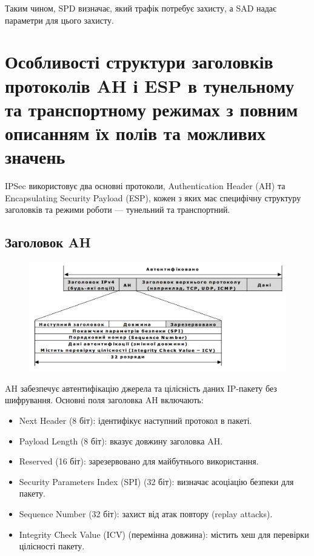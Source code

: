 Таким чином, SPD визначає, який трафік потребує захисту, а SAD надає параметри для цього захисту.

\section{Особливості структури заголовків протоколів AH і ESP в тунельному та транспортному режимах з повним описанням їх полів та можливих значень}

IPSec використовує два основні протоколи, Authentication Header (AH) та Encapsulating Security Payload (ESP), кожен з яких має специфічну структуру заголовків та режими роботи — тунельний та транспортний.

\subsection{Заголовок AH}

\begin{figure}[h!]
        \centering
        \includegraphics[scale=0.35]{IMAGES/AH_title.png}
        \label{fig_pacman}
\end{figure}

AH забезпечує автентифікацію джерела та цілісність даних IP-пакету без шифрування. Основні поля заголовка AH включають:

\begin{itemize}
    \item Next Header (8 біт): ідентифікує наступний протокол в пакеті.
    \item Payload Length (8 біт): вказує довжину заголовка AH.
    \item Reserved (16 біт): зарезервовано для майбутнього використання.
    \item Security Parameters Index (SPI) (32 біт): визначає асоціацію безпеки для пакету.
    \item Sequence Number (32 біт): захист від атак повтору (replay attacks).
    \item Integrity Check Value (ICV) (перемінна довжина): містить хеш для перевірки цілісності пакету.
\end{itemize}

